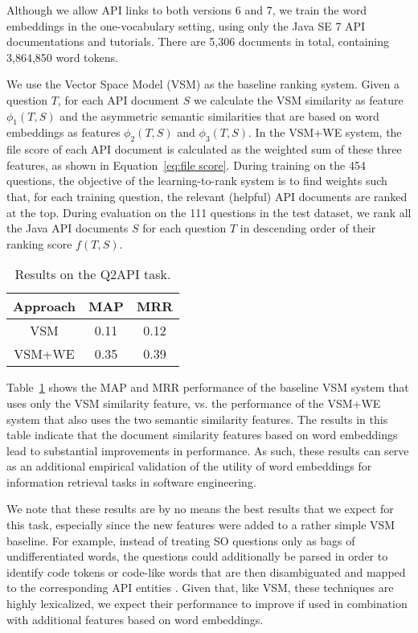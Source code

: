 Although we allow API links to both versions 6 and 7, we train the word embeddings in the one-vocabulary setting, using only the Java SE 7 API documentations and tutorials. There are 5,306 documents in total, containing 3,864,850 word tokens. 

We use the Vector Space Model (VSM) as the baseline ranking system. Given a question $T$, for each API document $S$ we calculate the VSM similarity as feature $\phi_1(T, S)$ and the asymmetric semantic similarities that are based on word embeddings as features $\phi_2(T, S)$ and $\phi_3(T, S)$. In the VSM+WE system, the file score of each API document is calculated as the weighted sum of these three features, as shown in Equation~\ref{eq:file score}. During training on the 454 questions, the objective of the learning-to-rank system is to find weights such that, for each training question, the relevant (helpful) API documents are ranked at the top. During evaluation on the 111 questions in the test dataset, we rank all the Java API documents $S$ for each question $T$ in descending order of their ranking score $f(T, S)$.

\begin{table}[ht]
\centering
\caption{Results on the Q2API task.}
\begin{tabular}{|c|c|c|} \hline
Approach & MAP & MRR\\ \hline
VSM & 0.11 & 0.12\\ \hline
VSM+WE & 0.35 & 0.39 \\ \hline 
\end{tabular}
\label{tab:comparison on SO questions}
\end{table}

Table~\ref{tab:comparison on SO questions} shows the MAP and MRR performance of the baseline VSM system that uses only the VSM similarity feature, vs. the performance of the VSM+WE system that also uses the two semantic similarity features. The results in this table indicate that the document similarity features based on word embeddings lead to substantial improvements in performance. As such, these results can serve as an additional empirical validation of the utility of word embeddings for information retrieval tasks in software engineering.

We note that these results are by no means the best results that we expect for this task, especially since the new features were added to a rather simple VSM baseline. For example, instead of treating SO questions only as bags of undifferentiated words, the questions could additionally be parsed in order to identify code tokens or code-like words that are then disambiguated and mapped to the corresponding API entities \cite{Bacchelli:2010:LES:1806799.1806855, Dagenais:2012:RTL:2337223.2337230, Subramanian:2014:LAD:2568225.2568313}. Given that, like VSM, these techniques are highly lexicalized, we expect their performance to improve if used in combination with additional features based on word embeddings. 
